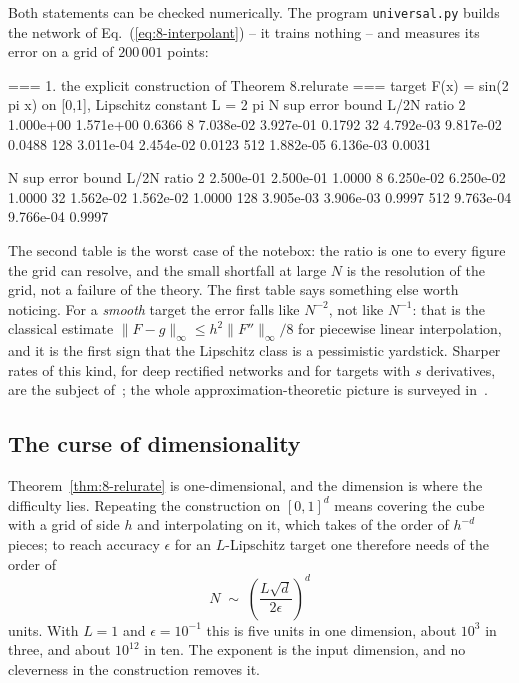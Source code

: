 Both statements can be checked numerically.  The program \verb!universal.py!
builds the network of Eq.~(\ref{eq:8-interpolant}) -- it trains nothing -- and
measures its error on a grid of $200\,001$ points:

\begin{Python}{}
=== 1. the explicit construction of Theorem 8.relurate ===
  target F(x) = sin(2 pi x) on [0,1], Lipschitz constant L = 2 pi
     N    sup error   bound L/2N   ratio
     2    1.000e+00    1.571e+00   0.6366
     8    7.038e-02    3.927e-01   0.1792
    32    4.792e-03    9.817e-02   0.0488
   128    3.011e-04    2.454e-02   0.0123
   512    1.882e-05    6.136e-03   0.0031
\end{Python}

\begin{Python}{}
     N    sup error   bound L/2N   ratio
     2    2.500e-01    2.500e-01   1.0000
     8    6.250e-02    6.250e-02   1.0000
    32    1.562e-02    1.562e-02   1.0000
   128    3.905e-03    3.906e-03   0.9997
   512    9.763e-04    9.766e-04   0.9997
\end{Python}

The second table is the worst case of the notebox: the ratio is one to every
figure the grid can resolve, and the small shortfall at large $N$ is the
resolution of the grid, not a failure of the theory.  The first table says
something else worth noticing.  For a \emph{smooth} target the error falls like
$N^{-2}$, not like $N^{-1}$: that is the classical estimate
$\|F-g\|_\infty\le h^{2}\|F''\|_\infty/8$ for piecewise linear interpolation,
and it is the first sign that the Lipschitz class is a pessimistic yardstick.
Sharper rates of this kind, for deep rectified networks and for targets with
$s$ derivatives, are the subject of~\cite{yarotsky2017}; the whole
approximation-theoretic picture is surveyed in~\cite{pinkus1999}.

\subsection{The curse of dimensionality}
\label{sec:universalcurse}

Theorem~\ref{thm:8-relurate} is one-dimensional, and the dimension is where the
difficulty lies.  Repeating the construction on $[0,1]^{d}$ means covering the
cube with a grid of side $h$ and interpolating on it, which takes of the order
of $h^{-d}$ pieces; to reach accuracy $\epsilon$ for an $L$-Lipschitz target
one therefore needs of the order of
\begin{equation}
  N \;\sim\; \left(\frac{L\sqrt{d}}{2\epsilon}\right)^{d}
  \label{eq:8-curse}
\end{equation}
units.  With $L=1$ and $\epsilon=10^{-1}$ this is five units in one dimension,
about $10^{3}$ in three, and about $10^{12}$ in ten.  The exponent is the input
dimension, and no cleverness in the construction removes it.

